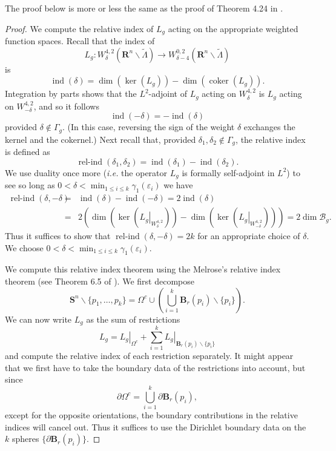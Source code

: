 \documentclass[reqno,11pt]{amsart}
\theoremstyle{tttheorem}
\newcommand{\Ss}{\mathbf{S}}
\newcommand{\R}{\mathbf{R}}
\begin{document}
The proof below is more or less the same as the proof of 
Theorem 4.24 in \cite{MPU}. 
\begin{proof} We compute the relative index of $L_g$ acting 
on the appropriate weighted function spaces. Recall that the 
index of 
$$L_g : W^{4,2}_\delta (\R^n \backslash \widetilde \Lambda) 
\rightarrow W^{0,2}_{\delta-4} (\R^n \backslash \widetilde \Lambda)$$
is 
$$\operatorname{ind} (\delta) = \dim (\ker(L_g)) - 
\dim (\operatorname{coker}(L_g)). $$
Integration by parts shows that the $L^2$-adjoint of $L_g$ acting 
on $W^{4,2}_\delta$ is $L_g$ acting on $W^{4,2}_{-\delta}$, and so 
it follows 
$$\operatorname{ind} (-\delta) = - \operatorname{ind}(\delta) $$
provided $\delta \not \in \Gamma_g$. (In this case, reversing the 
sign of the weight $\delta$ exchanges the kernel and the cokernel.) 
Next recall that, provided 
$\delta_1, \delta_2 \not \in \Gamma_g$, the relative index is 
defined as 
$$\operatorname{rel-ind}(\delta_1, \delta_2) = \operatorname{ind}(\delta_1) 
- \operatorname{ind}(\delta_2) .$$
We use duality once more ({\it i.e.} the operator $L_g$ is formally 
self-adjoint in $L^2$) to see so long as $0 < \delta < \min_{1\leq i \leq k} 
\gamma_1(\varepsilon_i)$ we have 
\begin{eqnarray} \label{rel_ind_bnd_null} 
\operatorname{rel-ind} (\delta, -\delta) & = & \operatorname{ind}(\delta) 
- \operatorname{ind} (-\delta) = 2 \operatorname{ind}(\delta) \\ \nonumber
& = & 2 \left ( \dim(\ker(\left. L_g \right |_{W^{4,2}_\delta} ))
- \dim (\ker (\left. L_g \right |_{W^{4,2}_{-\delta}} )) \right ) = 
2 \dim \mathcal{B}_g.
\end{eqnarray}
Thus it suffices to show that $\operatorname{rel-ind} (\delta, -\delta) 
= 2k$ for an appropriate choice of $\delta$. We choose $0 < \delta < 
\min_{1 \leq i \leq k} \gamma_1(\varepsilon_i)$. 

We compute this relative index theorem using the 
Melrose's relative index theorem (see Theorem 6.5 of \cite{Mel}). 
We first decompose 
$$\Ss^n \backslash \{ p_1, \dots, p_k\} = \Omega^c \cup \left ( 
\bigcup_{i=1}^k \mathbf{B}_r(p_i)\backslash \{ p_i\}\right ).$$
We can now write $L_g$ as the sum of restrictions 
$$L_g = \left. L_g \right |_{\Omega^c} + \sum_{i=1}^k  
\left. L_g \right |_{\mathbf{B}_r(p_i) \backslash \{ p_i\}}  $$
and compute the relative index of each restriction separately. It 
might appear that we first have to take the boundary data of 
the restrictions into account, but since 
$$\partial \Omega^c = \bigcup_{i=1}^k \partial \mathbf{B}_r(p_i),$$ 
except for the opposite orientations, the boundary contributions 
in the relative indices will cancel out. Thus it suffices to use the 
Dirichlet boundary data on the $k$ spheres $\{ \partial \mathbf{B}_r(p_i)\}$. 


\end{proof}
\end{document}
